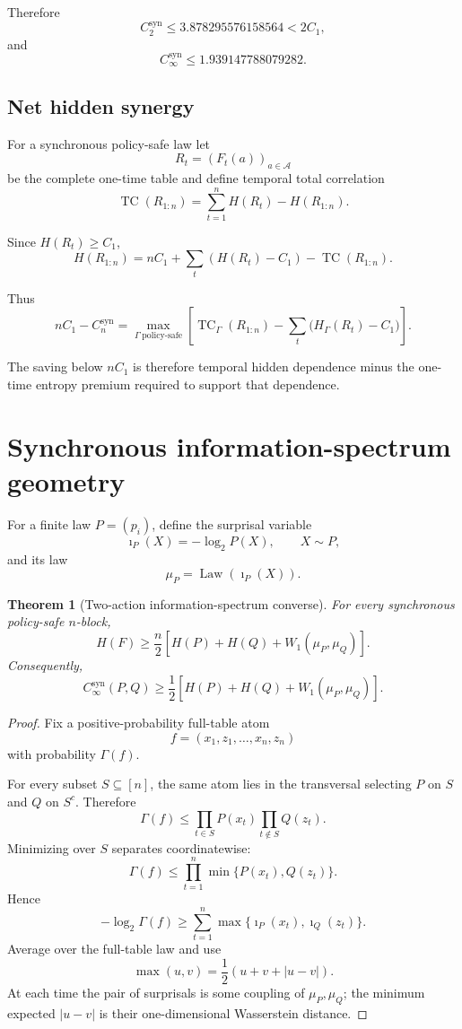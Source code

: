 \documentclass[11pt,a4paper]{article}
\newtheorem{theorem}{Theorem}[section]
\newcommand{\Law}{\operatorname{Law}}
\newcommand{\TC}{\operatorname{TC}}
\newcommand{\Csyn}{C^{\mathrm{syn}}}
\newcommand{\CinfSyn}{C_{\infty}^{\mathrm{syn}}}
\newcommand{\cA}{\mathcal A}
\newcommand{\1}{\mathbf 1}
\begin{document}
Therefore
\[
\boxed{
\Csyn_2
\le
3.878295576158564
<
2C_1,
}
\tag{8.5}
\]
and
\[
\boxed{
\CinfSyn
\le
1.939147788079282.
}
\tag{8.6}
\]


\subsection{Net hidden synergy}

For a synchronous policy-safe law let
\[
R_t=(F_t(a))_{a\in\cA}
\]
be the complete one-time table and define temporal total correlation
\[
\TC(R_{1:n})
=
\sum_{t=1}^nH(R_t)-H(R_{1:n}).
\tag{8.7}
\]

Since \(H(R_t)\ge C_1\),
\[
H(R_{1:n})
=
nC_1
+
\sum_t(H(R_t)-C_1)
-
\TC(R_{1:n}).
\]

Thus
\[
\boxed{
nC_1-\Csyn_n
=
\max_{\Gamma\ \mathrm{policy\text{-}safe}}
\left[
\TC_\Gamma(R_{1:n})
-
\sum_t
\bigl(
H_\Gamma(R_t)-C_1
\bigr)
\right].
}
\tag{8.8}
\]

The saving below \(nC_1\) is therefore temporal hidden dependence minus
the one-time entropy premium required to support that dependence.


\section{Synchronous information-spectrum geometry}

For a finite law \(P=(p_i)\), define the surprisal variable
\[
\imath_P(X)
=
-\log_2P(X),
\qquad
X\sim P,
\tag{9.1}
\]
and its law
\[
\mu_P
=
\Law(\imath_P(X)).
\tag{9.2}
\]

\begin{theorem}[Two-action information-spectrum converse]
For every synchronous policy-safe \(n\)-block,
\[
\boxed{
H(F)
\ge
\frac n2
\left[
H(P)+H(Q)+W_1(\mu_P,\mu_Q)
\right].
}
\tag{9.3}
\]
Consequently,
\[
\boxed{
\CinfSyn(P,Q)
\ge
\frac12
\left[
H(P)+H(Q)+W_1(\mu_P,\mu_Q)
\right].
}
\tag{9.4}
\]
\end{theorem}

\begin{proof}
Fix a positive-probability full-table atom
\[
f=(x_1,z_1,\ldots,x_n,z_n)
\]
with probability \(\Gamma(f)\).

For every subset \(S\subseteq[n]\), the same atom lies in the
transversal selecting \(P\) on \(S\) and \(Q\) on \(S^c\).
Therefore
\[
\Gamma(f)
\le
\prod_{t\in S}P(x_t)
\prod_{t\notin S}Q(z_t).
\]
Minimizing over \(S\) separates coordinatewise:
\[
\Gamma(f)
\le
\prod_{t=1}^n
\min\{P(x_t),Q(z_t)\}.
\tag{9.5}
\]
Hence
\[
-\log_2\Gamma(f)
\ge
\sum_{t=1}^n
\max\{
\imath_P(x_t),\imath_Q(z_t)
\}.
\]
Average over the full-table law and use
\[
\max(u,v)
=
\frac12(u+v+|u-v|).
\]
At each time the pair of surprisals is some coupling of
\(\mu_P,\mu_Q\); the minimum expected \(|u-v|\) is their
one-dimensional Wasserstein distance.
\end{proof}
\end{document}
